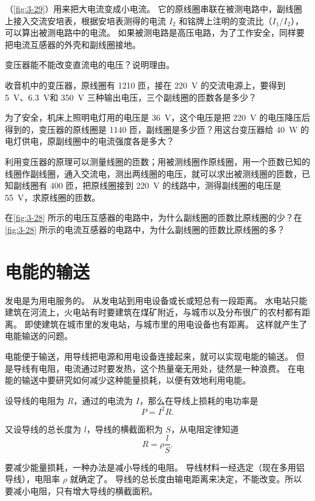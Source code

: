 （\cref{fig:3-29}）用来把大电流变成小电流。
它的原线圈串联在被测电路中，副线圈上接入交流安培表，根据安培表测得的电流 $I_2$ 和铭牌上注明的变流比（$I_1/I_2$），可以算出被测电路中的电流。
如果被测电路是高压电路，为了工作安全，同样要把电流互感器的外壳和副线圈接地。

\begin{Practice}
\begin{question}
  \item 变压器能不能改变直流电的电压？说明理由。
  \item 收音机中的变压器，原线圈有 1210 匝，接在 \qty{220}{V} 的交流电源上，要得到 \qty{5}{V}、\qty{6.3}{V}和 \qty{350}{V} 三种输出电压，三个副线圈的匝数各是多少？
  \item 为了安全，机床上照明电灯用的电压是 \qty{36}{V}，这个电压是把 \qty{220}{V} 的电压降压后得到的，变压器的原线圈是 1140 匝，副线圈是多少匝？用这台变压器给 \qty{40}{W} 的电灯供电，原副线圈中的电流强度各是多大？
  \item 利用变压器的原理可以测量线圈的匝数；用被测线圈作原线圈，用一个匝数已知的线圈作副线圈，通入交流电，测出两线圈的电压，就可以求出被测线圈的匝数，已知副线圈有 400 匝，把原线圈接到 \qty{220}{V} 的线路中，测得副线圈的电压是 \qty{55}{V}，求原线圈的匝数。
  \item 在\cref{fig:3-28} 所示的电压互感器的电路中，为什么副线圈的匝数比原线圈的少？在\cref{fig:3-28} 所示的电流互感器的电路中，为什么副线圈的匝数比原线圈的多？
\end{question}
\end{Practice}

\section{电能的输送}
发电是为用电服务的。
从发电站到用电设备或长或短总有一段距离。
水电站只能建筑在河流上，火电站有时要建筑在煤矿附近，与城市以及分布很广的农村都有距离。
即使建筑在城市里的发电站，与城市里的用电设备也有距离。
这样就产生了电能输送的问题。

电能便于输送，用导线把电源和用电设备连接起来，就可以实现电能的输送。
但是导线有电阻，电流通过时要发热，这个热量毫无用处，徒然是一种浪费。
在电能的输送中要研究如何减少这种能量损耗，以便有效地利用电能。

设导线的电阻为 $R$，通过的电流为 $I$，那么在导线上损耗的电功率是
\[P=I^2R. \]

又设导线的总长度为 $l$，导线的横截面积为 $S$，从电阻定律知道
\[ R=\rho\frac{l}{S}.\]

要减少能量损耗，一种办法是减小导线的电阻。
导线材料一经选定（现在多用铝导线），电阻率 $\rho$ 就确定了。
导线的总长度由输电距离来决定，不能改变。所以要减小电阻，只有增大导线的横截面积。


